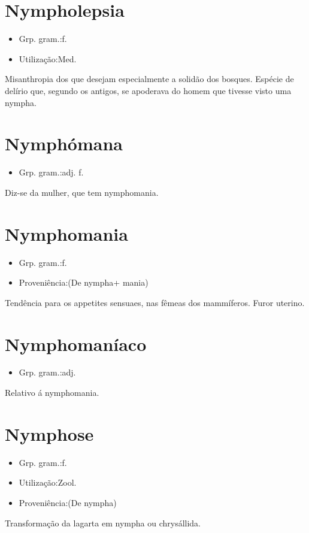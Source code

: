 \section{Nympholepsia}
\begin{itemize}
\item {Grp. gram.:f.}
\end{itemize}
\begin{itemize}
\item {Utilização:Med.}
\end{itemize}
Misanthropia dos que desejam especialmente a solidão dos bosques.
Espécie de delírio que, segundo os antigos, se apoderava do homem que tivesse visto uma nympha.
\section{Nymphómana}
\begin{itemize}
\item {Grp. gram.:adj. f.}
\end{itemize}
Diz-se da mulher, que tem nymphomania.
\section{Nymphomania}
\begin{itemize}
\item {Grp. gram.:f.}
\end{itemize}
\begin{itemize}
\item {Proveniência:(De \textunderscore nympha\textunderscore  + \textunderscore mania\textunderscore )}
\end{itemize}
Tendência para os appetites sensuaes, nas fêmeas dos mammíferos.
Furor uterino.
\section{Nymphomaníaco}
\begin{itemize}
\item {Grp. gram.:adj.}
\end{itemize}
Relativo á nymphomania.
\section{Nymphose}
\begin{itemize}
\item {Grp. gram.:f.}
\end{itemize}
\begin{itemize}
\item {Utilização:Zool.}
\end{itemize}
\begin{itemize}
\item {Proveniência:(De \textunderscore nympha\textunderscore )}
\end{itemize}
Transformação da lagarta em nympha ou chrysállida.
